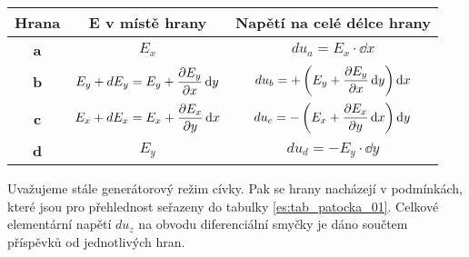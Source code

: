         \begin{table*}[ht!]
          \centering
          \begin{tabular}{|c|c|c|}
            \rowcolor[HTML]{FFFFC7}
            \hline Hrana      & E v místě hrany 
                              & Napětí na celé délce hrany                                     \\ 
            \hline \textbf{a} & \(E_x\)
                              & \(du_a=E_x\cdot \dd{x}\)                                           \\ 
            \hline \textbf{b} & \(E_y+dE_y = E_y + \dfrac{\partial E_y}{\partial x}\mathop{}\!\mathrm{d}y\) 
                              & \(du_b= +\left(E_y + \dfrac{\partial E_y}{\partial x}\mathop{}\!\mathrm{d}y\right)\mathop{}\!\mathrm{d}x\)                \\ 
            \hline \textbf{c} & \(E_x+dE_x = E_x + \dfrac{\partial E_x}{\partial y}\mathop{}\!\mathrm{d}x\)
                              & \(du_c= -\left(E_x + \dfrac{\partial E_x}{\partial y}\mathop{}\!\mathrm{d}x\right)\mathop{}\!\mathrm{d}y\)                \\ 
            \hline \textbf{d} & \(E_y\)                              
                              & \(du_d= - E_y\cdot \dd{y}\)                                        \\ 
            \hline 
          \end{tabular} 
          \caption{Podmínky, ve kterých se nacházejí hrany \(a, b, c, d\) diferenciální plochy 
                   \(dS_z\). Znaménko je vztaženo vůči zvolenému směru oběhu.}
          \label{es:tab_patocka_01}
        \end{table*}
        
        Uvažujeme stále generátorový režim cívky. Pak se hrany nacházejí v podmínkách, které jsou 
        pro přehlednost seřazeny do tabulky \ref{es:tab_patocka_01}. Celkové elementární napětí 
        \(du_z\) na obvodu diferenciální smyčky je dáno součtem příspěvků od jednotlivých hran.
        
